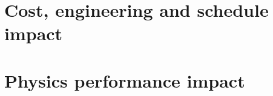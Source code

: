 
\chapter{Cost, engineering and schedule impact}
\label{cha:engineering}










\chapter{Physics performance impact}
\label{cha:performance}




